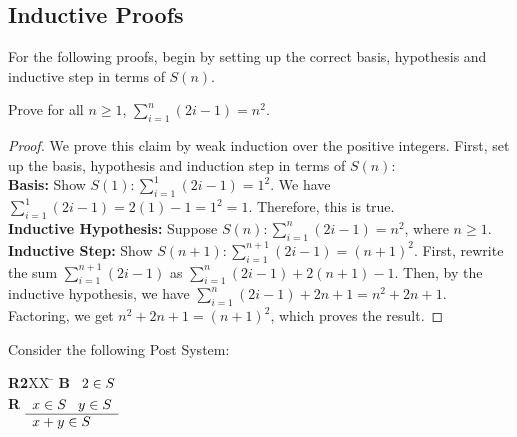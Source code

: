 \documentclass[]{exam}
\begin{document}
\begin{questions}
\section*{Inductive Proofs}
For the following proofs, begin by setting up the correct basis, hypothesis
and inductive step in terms of $S(n)$.


\question Prove for all $n \geq 1$, $\sum_{i=1}^{n} (2i - 1) = n^2$. 
\begin{solution}
\begin{proof}
We prove this claim by weak induction over the positive integers. 
First, set up the basis, hypothesis and induction step in terms of $S(n)$:
~\\
\textbf{Basis:} Show $S(1): \sum_{i=1}^1 (2i - 1) = 1^2$. We have $ \sum_{i=1}^1
(2i - 1) = 2(1) - 1 = 1^2 = 1$. Therefore, this is true.
~\\
\textbf{Inductive Hypothesis:} Suppose $S(n): \sum_{i=1}^{n}(2i - 1) = n^2$, 
  where $n \geq 1$.
~\\
\textbf{Inductive Step:} Show $S(n+1): \sum_{i=1}^{n+1} (2i - 1) = (n + 1)^2$. 
First, rewrite the sum $\sum_{i=1}^{n+1} (2i - 1)$ as $\sum_{i=1}^{n}
(2i - 1) + 2(n+1) - 1$. Then, by the inductive hypothesis, we have $\sum_{i=1}^{n}
(2i - 1) + 2n + 1 = n^2 + 2n + 1$. Factoring, we get $n^2 + 2n + 1 = (n + 1)^2$,
which proves the result.
\end{proof}

\end{solution}

\question Consider the following Post System:
\begin{tabbing}
{\bf R2}XX \=  \kill
{\bf B} \>
        \(\begin{array}[t]{l}
        2\in S
        \end{array}\) \\[2ex]
{\bf R} \>
        \(\begin{array}[t]{l}
        x \in S \;\;\;y \in S \\
        \hline
        x + y \in S
        \end{array}\)
\end{tabbing}


\end{questions}
\end{document}
